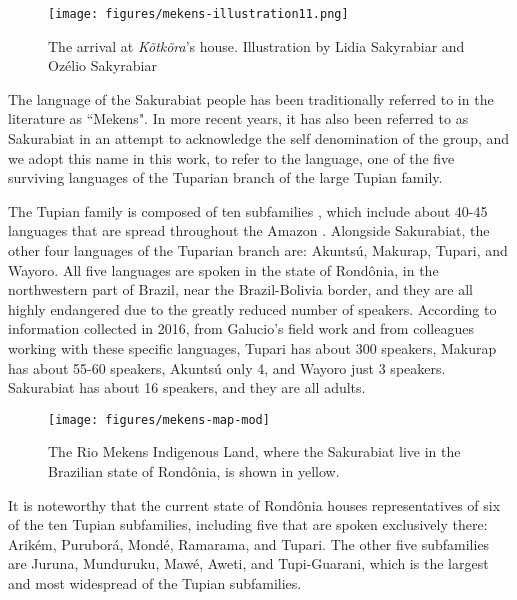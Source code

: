 \documentclass[output=paper,
modfonts,nonflat
]{langsci/langscibook}
\begin{document}
\begin{figure}
\texttt{[image: figures/mekens-illustration11.png]}
  \caption{The arrival at \textit{Kõtkõra}'s house. Illustration by Lidia Sakyrabiar and Ozélio Sakyrabiar}
\end{figure}

The language of the Sakurabiat people has been traditionally referred to in the literature as “Mekens". In more recent years, it has also been referred to as Sakurabiat in an attempt to acknowledge the self denomination of the group, and we adopt this name in this work, to refer to the language, one of the five surviving languages of the Tuparian branch of the large Tupian family.

\newpage 
The Tupian family is composed of ten subfamilies \citep{hv:Rodrigues:Tupi-Guarani:Internas}, which include about 40-45 languages that are spread throughout the Amazon \citep{hel:Mooreetal:Amazonicas}.
Alongside Sakurabiat, the other four languages of the Tuparian branch are: Akuntsú, Makurap, Tupari, and Wayoro.
All five languages are spoken in the state of Rondônia, in the northwestern part of Brazil, near the Brazil-Bolivia border, and they are all highly endangered due to the greatly reduced number of speakers. 
According to information collected in 2016, from Galucio's  field work and from colleagues working with these specific languages, Tupari has about 300 speakers, Makurap has about 55-60 speakers, Akun\-tsú only 4, and Wayoro just 3 speakers. Sakurabiat has about 16 speakers, and they are all adults. 

\begin{figure} 
\texttt{[image: figures/mekens-map-mod]}
  \caption{The Rio Mekens Indigenous Land, where the Sakurabiat live in the Brazilian state of Rondônia, is shown in yellow.}
  \label{fig:mekens:map}
\end{figure}

It is noteworthy that the current state of Rondônia houses representatives of six of the ten Tupian subfamilies, including five that are spoken exclusively there: Arikém, Puruborá, Mondé, Ramarama, and Tupari. The other five subfamilies are Juruna, Munduruku, Mawé, Aweti, and Tupi-Guarani, which is the largest and most widespread of the Tupian subfamilies.
\end{document}
